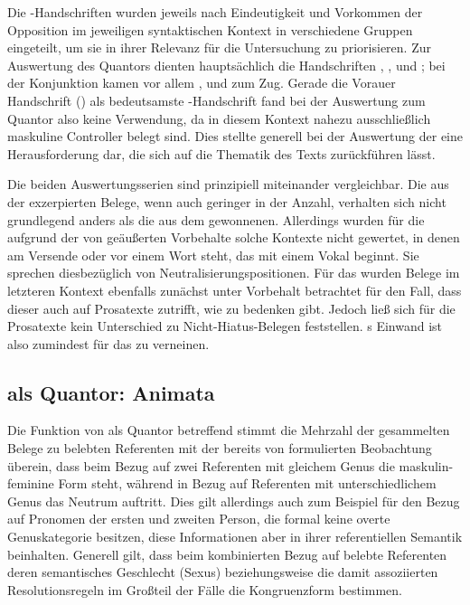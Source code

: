 Die \citet{kc}-Handschriften wurden jeweils nach Eindeutigkeit und Vorkommen
der Opposition im jeweiligen syntaktischen Kontext in verschiedene Gruppen
eingeteilt, um sie in ihrer Relevanz für die Untersuchung zu priorisieren. Zur
Auswertung des Quantors  dienten hauptsächlich die Handschriften
\citet{kc:B1}, \citet{kc:C1}, \citet{kc:K} und \citet{kc:VB}; bei der
Konjunktion  kamen vor allem \citet{kc:A1}, \citet{kc:B1} und
\citet{kc:VB} zum Zug. Gerade die Vorauer Handschrift (\citet{kc:A1}) als
bedeutsamste \citet{kc}-Handschrift fand bei der Auswertung zum Quantor
 also keine Verwendung, da in diesem Kontext nahezu
ausschließlich maskuline Controller belegt sind. Dies stellte generell bei der
Auswertung der \citet{kc} eine Herausforderung dar, die sich auf die Thematik
des Texts zurückführen lässt.

Die beiden Auswertungsserien sind prinzipiell miteinander vergleichbar. Die aus
der \citet{kc} exzerpierten Belege, wenn auch geringer in der Anzahl, verhalten
sich nicht grundlegend anders als die aus dem  gewonnenen.
Allerdings wurden für die \citet{kc} aufgrund der von
\textcites[89--90]{askedal1973}[191]{gjelsten1980} geäußerten Vorbehalte solche
Kontexte nicht gewertet, in denen  am Versende oder vor einem Wort
steht, das mit einem Vokal beginnt. Sie sprechen diesbezüglich von
Neutralisierungs\-positionen. Für das  wurden Belege im
letzteren Kontext ebenfalls zunächst unter Vorbehalt betrachtet für den Fall,
dass dieser auch auf Prosatexte zutrifft, wie \citet[92]{askedal1973} zu
bedenken gibt. Jedoch ließ sich für die Prosatexte kein Unterschied zu
Nicht-\allowbreak{}Hiatus-\allowbreak{}Belegen feststellen.
\citeauthor{askedal1973}s Einwand ist also zumindest für das  zu
verneinen.

\subsection{ als Quantor: Animata}

Die Funktion von  als Quantor betreffend stimmt die Mehrzahl
der gesammelten Belege zu belebten Referenten mit der bereits von
\textcites[312]{grimm1890}[39--41]{behaghel1928} formulierten Beobachtung
überein, dass beim Bezug auf zwei Referenten mit gleichem Genus die
maskulin-feminine Form steht, während in Bezug auf Referenten mit
unterschiedlichem Genus das Neutrum auftritt. Dies gilt allerdings auch zum
Beispiel für den Bezug auf Pronomen der ersten und zweiten Person, die formal
keine overte Genuskategorie besitzen, diese Informationen aber in ihrer
referentiellen Semantik beinhalten. Generell gilt, dass beim kombinierten Bezug
auf belebte Referenten deren semantisches Geschlecht (Sexus) beziehungsweise
die damit assoziierten Resolutionsregeln im Großteil der Fälle die
Kongruenzform bestimmen.

